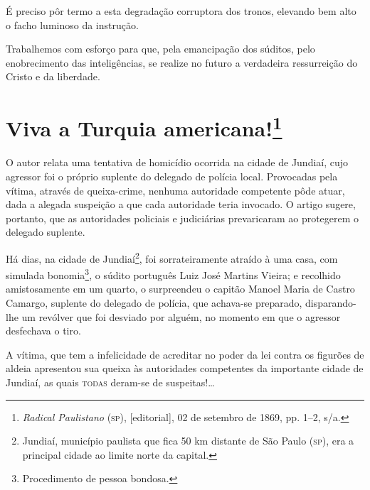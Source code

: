 É preciso pôr termo a esta degradação corruptora dos tronos, elevando
bem alto o facho luminoso da instrução.

Trabalhemos com esforço para que, pela emancipação dos súditos, pelo
enobrecimento das inteligências, se realize no futuro a verdadeira
ressurreição do Cristo e da liberdade.

\chapter{Viva a Turquia americana!\footnote{\emph{Radical Paulistano}
  (\textsc{sp}), {[}editorial{]}, 02 de setembro de 1869, pp. 1--2, s/a.}}

\begin{didascalia}
O autor relata uma tentativa de homicídio ocorrida na cidade de Jundiaí,
cujo agressor foi o próprio suplente do delegado de polícia local.
Provocadas pela vítima, através de queixa-crime, nenhuma autoridade
competente pôde atuar, dada a alegada suspeição a que cada autoridade
teria invocado. O artigo sugere, portanto, que as autoridades policiais
e judiciárias prevaricaram ao protegerem o delegado suplente.
\end{didascalia}



Há dias, na cidade de Jundiaí\footnote{Jundiaí, município paulista que
  fica 50 km distante de São Paulo (\textsc{sp}), era a principal cidade ao
  limite norte da capital.}, foi sorrateiramente atraído à uma casa, com
simulada bonomia\footnote{Procedimento de pessoa bondosa.}, o súdito
português Luiz José Martins Vieira; e recolhido amistosamente em um
quarto, o surpreendeu o capitão Manoel Maria de Castro Camargo, suplente
do delegado de polícia, que achava-se preparado, disparando-lhe um
revólver que foi desviado por alguém, no momento em que o agressor
desfechava o tiro.

A vítima, que tem a infelicidade de acreditar no poder da lei contra os
figurões de aldeia apresentou sua queixa às autoridades competentes da
importante cidade de Jundiaí, as quais \textsc{todas} deram-se de suspeitas!\ldots{}

